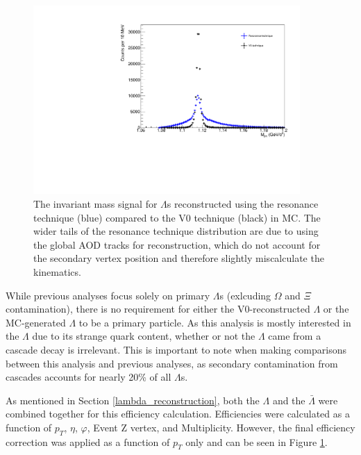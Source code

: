 \documentclass[ALICE,manyauthors]{ALICE_analysis_notes}
\begin{document}
\begin{figure}[ht]
\centering
\includegraphics[width=4in]{figures/lambda_mass_resonance_mc.pdf}
\caption{The invariant mass signal for $\Lambda$s reconstructed using the resonance technique (blue) compared to the V0 technique (black) in MC. The wider tails of the resonance technique distribution are due to using the global AOD tracks for reconstruction, which do not account for the secondary vertex position and therefore slightly miscalculate the kinematics.}
\label{lambda_eff}
\end{figure}

While previous analyses focus solely on primary $\Lambda$s (exlcuding $\Omega$ and $\Xi$ contamination), there is no requirement for either the V0-reconstructed $\Lambda$ or the MC-generated $\Lambda$ to be a primary particle. As this analysis is mostly interested in the $\Lambda$ due to its strange quark content, whether or not the $\Lambda$ came from a cascade decay is irrelevant. This is important to note when making comparisons between this analysis and previous analyses, as secondary contamination from cascades accounts for nearly 20\% of all $\Lambda$s.

As mentioned in Section \ref{lambda_reconstruction}, both the $\Lambda$ and the $\bar{\Lambda}$ were combined together for this efficiency calculation. Efficiencies were calculated as a function of $p_T$, $\eta$, $\varphi$, Event Z vertex, and Multiplicity. However, the final efficiency correction was applied as a function of $p_T$ only and can be seen in Figure \ref{lambda_eff}.
\end{document}
